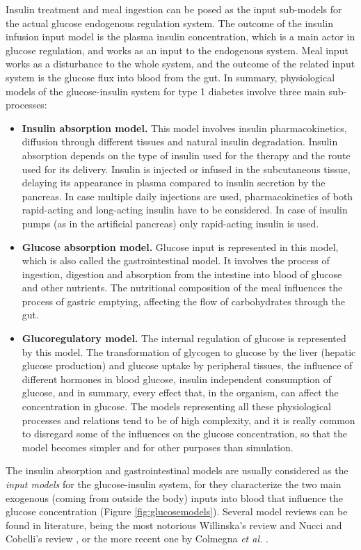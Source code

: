 Insulin treatment and meal ingestion can be posed as the input sub-models for the actual glucose endogenous regulation system. The outcome of the insulin infusion input model is the plasma insulin concentration, which is a main actor in glucose regulation, and works as an input to the endogenous system. Meal input works as a disturbance to the whole system, and the outcome of the related input system is the glucose flux into blood from the gut. In summary, physiological models of the glucose-insulin system for type 1 diabetes involve three main sub-processes:
\begin{itemize}
	\item \textbf{Insulin absorption model.} This model involves insulin pharmacokinetics, diffusion through different tissues and natural insulin degradation. Insulin absorption depends on the type of insulin used for the therapy and the route used for its delivery. Insulin is injected or infused in the subcutaneous tissue, delaying its appearance in plasma compared to insulin secretion by the pancreas. In case multiple daily injections are used, pharmacokinetics of both rapid-acting and long-acting insulin have to be considered. In case of insulin pumps (as in the artificial pancreas) only rapid-acting insulin is used.
	\item \textbf{Glucose absorption model.} Glucose input is represented in this model, which is also called the gastrointestinal model. It involves the process of ingestion, digestion and absorption from the intestine into blood of glucose and other nutrients. The nutritional composition of the meal influences the process of gastric emptying, affecting the flow of carbohydrates through the gut.
	\item \textbf{Glucoregulatory model.} The internal regulation of glucose is represented by this model. The transformation of glycogen to glucose by the liver (hepatic glucose production) and glucose uptake by peripheral tissues, the influence of different hormones in blood glucose, insulin independent consumption of glucose, and in summary, every effect that, in the organism, can affect the concentration in glucose. The models representing all these physiological processes and relations tend to be of high complexity, and it is really common to disregard some of the influences on the glucose concentration, so that the model becomes simpler and for other purposes than simulation.
\end{itemize}
The insulin absorption and gastrointestinal models are usually considered as the \textit{input models} for the glucose-insulin system, for they characterize the two main exogenous (coming from outside the body) inputs into blood that influence the glucose concentration (Figure \ref{fig:glucosemodels}). Several model reviews can be found in literature, being the most notorious Willinska's review \cite{wilinska2009simulation} and Nucci and Cobelli's review \cite{nucci2000models}, or the more recent one by Colmegna \textit{et al.} \cite{colmegna2014analysis}.

